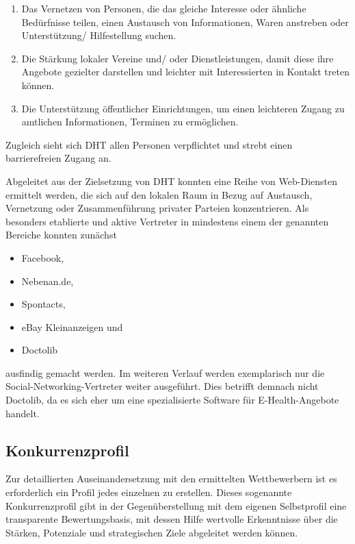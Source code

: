 \begin{enumerate}
    \item Das Vernetzen von Personen, die das gleiche Interesse oder ähnliche Bedürfnisse teilen, einen Austausch von \bspw Informationen, Waren \usw anstreben oder Unterstützung/ Hilfestellung suchen.
    \item Die Stärkung lokaler Vereine und/ oder Dienstleistungen, damit diese ihre Angebote gezielter darstellen und leichter mit Interessierten in Kontakt treten können.
    \item Die Unterstützung öffentlicher Einrichtungen, um einen leichteren Zugang \ua zu amtlichen Informationen, Terminen \usw zu ermöglichen.
\end{enumerate}

Zugleich sieht sich DHT allen Personen verpflichtet und strebt einen barrierefreien Zugang an.

Abgeleitet aus der Zielsetzung von DHT konnten eine Reihe von Web-Diensten ermittelt werden, die sich \ua auf den lokalen Raum in Bezug auf Austausch, Vernetzung oder Zusammenführung privater Parteien konzentrieren. Als besonders etablierte und aktive Vertreter in mindestens einem der genannten Bereiche konnten zunächst

\begin{itemize}
    \item Facebook,
    \item Nebenan.de,
    \item Spontacts,
    \item eBay Kleinanzeigen und
    \item Doctolib
\end{itemize}

ausfindig gemacht werden. Im weiteren Verlauf werden exemplarisch nur die Social-Networking-Vertreter weiter ausgeführt. Dies betrifft demnach nicht Doctolib, da es sich eher um eine spezialisierte Software für E-Health-Angebote handelt.

\subsection{Konkurrenzprofil}

Zur detaillierten Auseinandersetzung mit den ermittelten Wettbewerbern ist es erforderlich ein Profil jedes einzelnen zu erstellen. Dieses sogenannte Konkurrenzprofil gibt in der Gegenüberstellung mit dem eigenen Selbstprofil eine transparente Bewertungsbasis, mit dessen Hilfe wertvolle Erkenntnisse über die Stärken, Potenziale und strategischen Ziele abgeleitet werden können.

